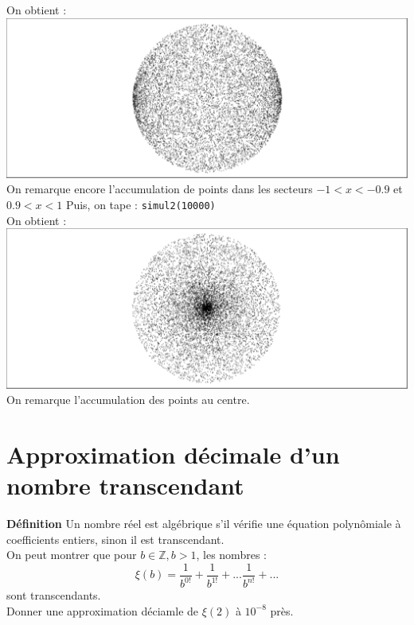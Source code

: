 \documentclass[a4paper,11pt]{book}
\newcommand{\Z}{{\mathbb{Z}}}
\begin{document}
On obtient :\\
\includegraphics[width=\textwidth]{simul1}\\
On remarque encore l'accumulation de points dans les 
secteurs $-1<x<-0.9$ et $0.9<x<1$
Puis, on tape : 
{\tt simul2(10000)}\\
On obtient :\\
\includegraphics[width=\textwidth]{simul2}\\
On remarque l'accumulation des points au centre.

\section{Approximation d\'ecimale d'un nombre transcendant}
{\bf D\'efinition} Un nombre r\'eel est alg\'ebrique s'il v\'erifie une 
\'equation polyn\^omiale \`a coefficients entiers, sinon il est transcendant.\\
On peut montrer que pour $b \in \Z, b>1$, les nombres :
$$\xi(b)=\frac{1}{b^{0!}}+\frac{1}{b^{1!}}+...\frac{1}{b^{n!}}+...$$
sont transcendants.\\
Donner une approximation d\'eciamle de $\xi(2)$ \`a 
$10^{-8}$ pr\`es.\\
\end{document}
